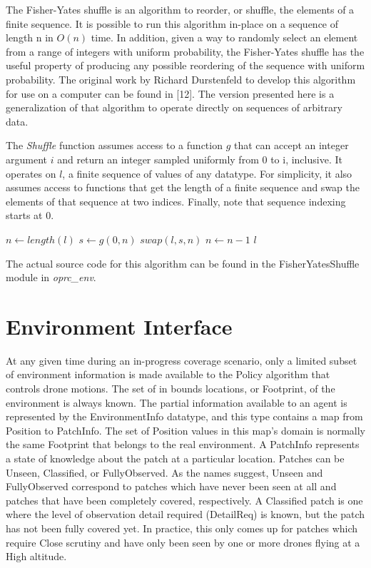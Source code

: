 The Fisher-Yates shuffle is an algorithm to reorder, or shuffle, the elements of a finite sequence. It is possible to run this algorithm in-place on a sequence of length n in $O(n)$ time. In addition, given a way to randomly select an element from a range of integers with uniform probability, the Fisher-Yates shuffle has the useful property of producing any possible reordering of the sequence with uniform probability. The original work by Richard Durstenfeld to develop this algorithm for use on a computer can be found in [12]. The version presented here is a generalization of that algorithm to operate directly on sequences of arbitrary data.

The \textit{Shuffle} function assumes access to a function $g$ that can accept an integer argument $i$ and return an integer sampled uniformly from 0 to i, inclusive. It operates on $l$, a finite sequence of values of any datatype. For simplicity, it also assumes access to functions that get the length of a finite sequence and swap the elements of that sequence at two indices. Finally, note that sequence indexing starts at 0.

\begin{algorithmic}

  \State $n\gets length(l)$	
      \State $s\gets g(0, n)$
      \State $swap(l, s, n)$
      \State $n\gets n - 1$
  \EndWhile
  \State \Return $l$
\EndFunction

\end{algorithmic}

The actual source code for this algorithm can be found in the FisherYatesShuffle module in \textit{oprc\_env}.

\section{Environment Interface}

At any given time during an in-progress coverage scenario, only a limited subset of environment information is made available to the Policy algorithm that controls drone motions. The set of in bounds locations, or Footprint, of the environment is always known. The partial information available to an agent is represented by the EnvironmentInfo datatype, and this type contains a map from Position to PatchInfo. The set of Position values in this map's domain is normally the same Footprint that belongs to the real environment. A PatchInfo represents a state of knowledge about the patch at a particular location. Patches can be Unseen, Classified, or FullyObserved. As the names suggest, Unseen and FullyObserved correspond to patches which have never been seen at all and patches that have been completely covered, respectively. A Classified patch is one where the level of observation detail required (DetailReq) is known, but the patch has not been fully covered yet. In practice, this only comes up for patches which require Close scrutiny and have only been seen by one or more drones flying at a High altitude.

